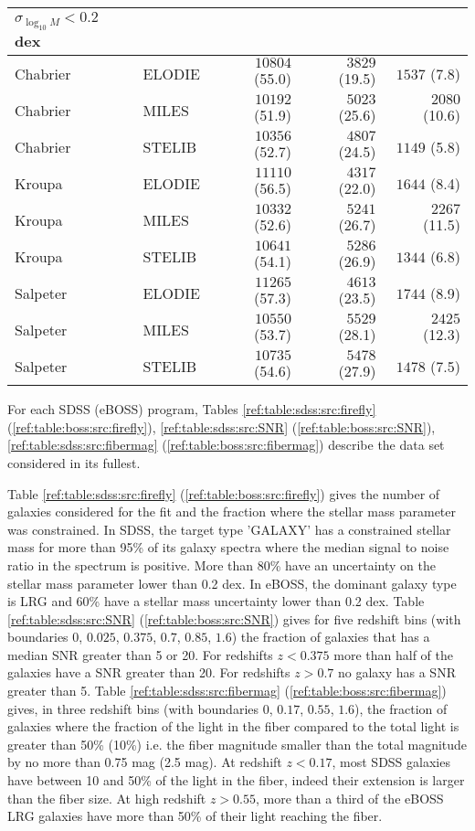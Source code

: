\documentclass[onecolumn]{aa}
\begin{document}
\begin{table*}
\begin{center}
\begin{tabular}{ll rrr}
$\sigma_{\log_{10}M}<0.2$ dex \\ \hline
Chabrier & ELODIE & $10804$ (55.0) & $3829$ (19.5) & $1537$ (7.8) \\ 
Chabrier & MILES & $10192$ (51.9) & $5023$ (25.6) & $2080$ (10.6) \\ 
Chabrier & STELIB & $10356$ (52.7) & $4807$ (24.5) & $1149$ (5.8) \\ 
Kroupa & ELODIE & $11110$ (56.5) & $4317$ (22.0) & $1644$ (8.4) \\ 
Kroupa & MILES & $10332$ (52.6) & $5241$ (26.7) & $2267$ (11.5) \\ 
Kroupa & STELIB & $10641$ (54.1) & $5286$ (26.9) & $1344$ (6.8) \\ 
Salpeter & ELODIE & $11265$ (57.3) & $4613$ (23.5) & $1744$ (8.9) \\ 
Salpeter & MILES & $10550$ (53.7) & $5529$ (28.1) & $2425$ (12.3) \\ 
Salpeter & STELIB & $10735$ (54.6) & $5478$ (27.9) & $1478$ (7.5) \\ 

\hline
\end{tabular}
\end{center}
\end{table*}


For each SDSS (eBOSS) program, Tables 
\ref{ref:table:sdss:src:firefly}
(\ref{ref:table:boss:src:firefly}), 
\ref{ref:table:sdss:src:SNR} 
(\ref{ref:table:boss:src:SNR}), 
\ref{ref:table:sdss:src:fibermag} 
(\ref{ref:table:boss:src:fibermag}) 
describe the data set considered in its fullest. 

Table 
\ref{ref:table:sdss:src:firefly} (\ref{ref:table:boss:src:firefly})
gives the number of galaxies considered for the fit and the fraction where the stellar mass parameter was constrained. 
In SDSS, the target type 'GALAXY' has a constrained stellar mass for more than 95\% of its galaxy spectra where the median signal to noise ratio in the spectrum is positive. 
More than 80\% have an uncertainty on the stellar mass parameter lower than 0.2 dex. 
In eBOSS, the dominant galaxy type is LRG and 60\% have a stellar mass uncertainty lower than 0.2 dex. 
Table 
\ref{ref:table:sdss:src:SNR} (\ref{ref:table:boss:src:SNR}) 
gives for five redshift bins (with boundaries $0$, $0.025$, $0.375$, $0.7$, $0.85$, $1.6$) the fraction of galaxies that has a median SNR greater than 5 or 20. For redshifts $z<0.375$ more than half of the galaxies have a SNR greater than 20. For redshifts $z>0.7$ no galaxy has a SNR greater than 5. 
Table 
\ref{ref:table:sdss:src:fibermag} (\ref{ref:table:boss:src:fibermag}) 
gives, in three redshift bins (with boundaries $0$, $0.17$,  $0.55$, $1.6$), the fraction of galaxies where the fraction of the light in the fiber compared to the total light is greater than 50\% (10\%) i.e. the fiber magnitude smaller than the total magnitude by no more than 0.75 mag (2.5 mag). 
At redshift $z<0.17$, most SDSS galaxies have between 10 and 50\% of the light in the fiber, indeed their extension is larger than the fiber size.  
At high redshift $z>0.55$, more than a third of the eBOSS LRG galaxies have more than 50\% of their light reaching the fiber.
\end{document}
